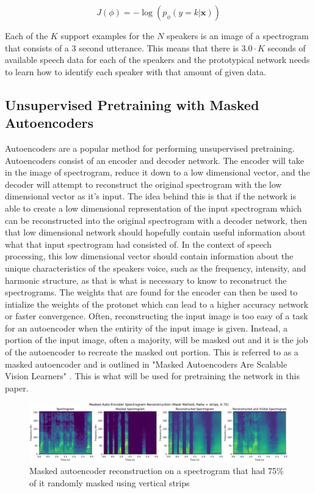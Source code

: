 \documentclass{article}
\begin{document}
\begin{equation}
  J\left(\phi\right) = - \log \left(p_\phi\left(y=k | \mathbf{x}\right)\right)
  \label{eq:prototypical_loss}
\end{equation}

Each of the $K$ support examples for the $N$ speakers is an image of a spectrogram that consists of a 3 second utterance.
This means that there is $3.0 \cdot K$ seconds of available speech data for each of the speakers and the prototypical
network needs to learn how to identify each speaker with that amount of given data.

\subsection{Unsupervised Pretraining with Masked Autoencoders}
Autoencoders are a popular method for performing unsupervised pretraining. Autoencoders consist of an encoder and decoder
network. The encoder will take in the image of spectrogram, reduce it down to a low dimensional vector, and the decoder
will attempt to reconstruct the original spectrogram with the low dimensional vector as it's input. The idea behind this
is that if the network is able to create a low dimensional representation of the input spectrogram which can be reconstructed
into the original spectrogram with a decoder network, then that low dimensional network should hopefully contain useful 
information about what that input spectrogram had consisted of. In the context of speech processing, this low dimensional 
vector should contain information about the unique characteristics of the speakers voice, such as the frequency, 
intensity, and harmonic structure, as that is what is necessary to know to reconstruct the spectrograms. The weights that 
are found for the encoder can then be used to intialize the weights of the protonet which can lead to a higher accuracy 
network or faster convergence. Often, reconstructing the input image is too easy of a task for an autoencoder when the 
entirity of the input image is given. Instead, a portion of the input image, often a majority, will be masked out and it 
is the job of the autoencoder to recreate the masked out portion. This is referred to as a masked autoencoder and is 
outlined in "Masked Autoencoders Are Scalable Vision Learners" \cite{MAE}. This is what will be used for pretraining the
network in this paper.

\begin{figure}
  \centering
  \includegraphics[width=1.0\textwidth]{Images/mae_mask_strips_mask_ratio_75_lr_005_batch_64.png}
  \caption{Masked autoencoder reconstruction on a spectrogram that had 75\% of it randomly masked using vertical strips}
  \label{fig:MAEStrips}
\end{figure}
\end{document}
